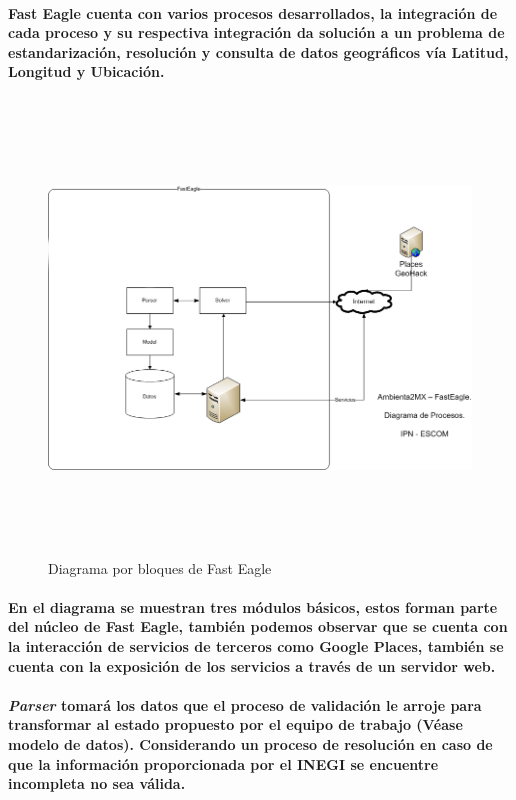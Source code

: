     \paragraph{Fast Eagle cuenta con varios procesos desarrollados, la integración de cada proceso y su respectiva integración da solución a un problema de estandarización, resolución y consulta de datos geográficos vía Latitud, Longitud y Ubicación.}
    \newpage
      \begin{landscape}
        \begin{figure}[b!]
        \centering
        \includegraphics[width=22.5cm,height=12cm]{./images/DiagramaFastEagle}
        \caption{Diagrama por bloques de Fast Eagle}
      \end{figure}
      \end{landscape}
    \newpage
    \paragraph{En el diagrama se muestran tres módulos básicos, estos forman parte del núcleo de Fast Eagle, también podemos observar que se cuenta con la interacción de servicios de terceros como Google Places,  también se cuenta con la exposición de los servicios a través de un servidor web.}
    \paragraph{\textbf{\emph{Parser}} tomará los datos que el proceso de validación le arroje para transformar al estado propuesto por el equipo de trabajo (Véase modelo de datos). Considerando un proceso de resolución en caso de que la información proporcionada por el INEGI se encuentre incompleta no sea válida.}
